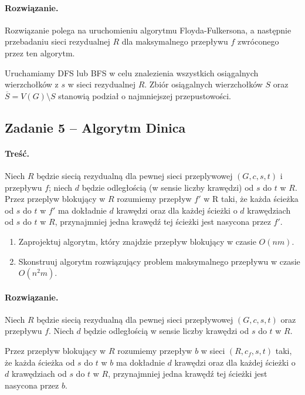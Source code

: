 \paragraph{Rozwiązanie.}
Rozwiązanie polega na uruchomieniu algorytmu Floyda-Fulkersona, a
następnie przebadaniu sieci rezydualnej $R$ dla maksymalnego przepływu $f$
zwróconego przez ten algorytm.

Uruchamiamy DFS lub BFS w celu znalezienia wszystkich osiągalnych wierzchołków 
z $s$ w sieci rezydualnej $R$. Zbiór osiągalnych wierzchołków $S$ oraz 
$\overline{S} = V(G) \setminus S$ stanowią podział o najmniejszej 
przepustowości.

\subsection{Zadanie 5 -- Algorytm Dinica}
\paragraph{Treść.} Niech $R$ będzie siecią rezydualną 
dla pewnej sieci przeplywowej $(G, c, s, t)$ i przepływu $f$; 
niech $d$ będzie
odległością (w sensie liczby krawędzi) od $s$ do $t$ w $R$. 
Przez przeplyw blokujący w $R$ rozumiemy przepływ $f'$ w R taki,
że każda ścieżka od $s$ do $t$ w $f'$ ma dokładnie 
$d$ krawędzi oraz dla każdej ścieżki o $d$ krawędziach od $s$ do $t$ w $R$,
przynajmniej jedna krawędź tej ścieżki jest nasycona przez $f'$.
\begin{enumerate}[label=\alph*)]
	\item Zaprojektuj algorytm, który znajdzie przepływ blokujący w czasie $O(nm)$.
	\item Skonstruuj algorytm rozwiązujący problem maksymalnego przepływu w czasie $O(n^2m)$.
\end{enumerate}
\paragraph{Rozwiązanie.} 

\begin{defi}
	Niech $R$ będzie siecią rezydualną dla pewnej sieci przepływowej
	$(G, c, s, t)$ oraz przepływu $f$. Niech $d$ będzie odległością w sensie
	liczby krawędzi od $s$ do $t$ w $R$.
	
	Przez przepływ blokujący w $R$ rozumiemy przepływ $b$ w sieci
	$(R, c_f, s, t)$ taki, że każda ścieżka od $s$ do $t$ 
	w $b$ ma dokładnie $d$ krawędzi oraz dla każdej ścieżki o $d$ 
	krawędziach od $s$ do $t$ w $R$, przynajmniej jedna krawędź tej ścieżki
	jest nasycona przez $b$.
\end{defi}

